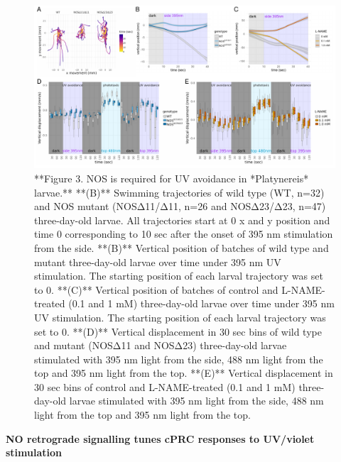 \documentclass[
  10pt,
  onecolumn]{article}
\begin{document}
\begin{figure}
\includegraphics[width=33.33in]{figures/Fig3} \caption{**Figure 3. NOS is required for UV avoidance in *Platynereis* larvae.**  **(B)** Swimming trajectories of wild type (WT, n=32) and NOS mutant (NOSΔ11/Δ11, n=26 and NOSΔ23/Δ23, n=47) three-day-old larvae. All trajectories start at 0 x and y position and time 0 corresponding to 10 sec after the onset of 395 nm stimulation from the side. **(B)** Vertical position of batches of wild type and mutant three-day-old larvae over time under 395 nm UV stimulation. The starting position of each larval trajectory was set to 0. **(C)** Vertical position of batches of control and L-NAME-treated (0.1 and 1 mM) three-day-old larvae over time under 395 nm UV stimulation. The starting position of each larval trajectory was set to 0. **(D)** Vertical displacement in 30 sec bins of wild type and mutant (NOSΔ11 and NOSΔ23) three-day-old larvae stimulated with 395 nm light from the side, 488 nm light from the top and 395 nm light from the top. **(E)** Vertical displacement in 30 sec bins of control and L-NAME-treated (0.1 and 1 mM) three-day-old larvae stimulated with 395 nm light from the side, 488 nm light from the top and 395 nm light from the top.}\label{fig:unnamed-chunk-3}
\end{figure}

\textbf{NO retrograde signalling tunes cPRC responses to UV/violet
stimulation}
\end{document}
